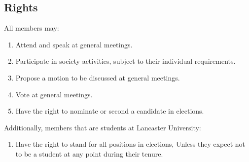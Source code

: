 \documentclass[parskip=half]{scrartcl}
\begin{document}
        \subsection{Rights}
            \label{membership--rights}
            All members may:
            \begin{enumerate}
                \item Attend and speak at general meetings.
                \item Participate in society activities, subject to their individual requirements.
                \item Propose a motion to be discussed at general meetings.
                \item Vote at general meetings.
                \item Have the right to nominate or second a candidate in elections.
            \end{enumerate}

            Additionally, members that are students at Lancaster University:
            \begin{enumerate}
                \item Have the right to stand for all positions in elections, Unless they expect not to be a student at any point during their tenure.
            \end{enumerate}
            
\end{document}
